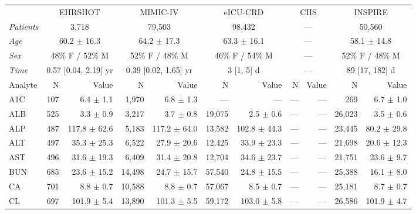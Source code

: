 \begin{table}[ht]
\centering
\scriptsize
\begin{tabular}{lrrrrrrrrrr}
\toprule
  & \multicolumn{2}{c}{EHRSHOT} & \multicolumn{2}{c}{MIMIC-IV} & \multicolumn{2}{c}{eICU-CRD} & \multicolumn{2}{c}{CHS} & \multicolumn{2}{c}{INSPIRE} \\
\cmidrule(lr){2-3} \cmidrule(lr){4-5} \cmidrule(lr){6-7} \cmidrule(lr){8-9} \cmidrule(lr){10-11}
\textit{Patients} & \multicolumn{2}{c}{3,718} & \multicolumn{2}{c}{79,503} & \multicolumn{2}{c}{98,432} & \multicolumn{2}{c}{---} & \multicolumn{2}{c}{50,560} \\
\textit{Age} & \multicolumn{2}{c}{60.2 $\pm$ 16.3} & \multicolumn{2}{c}{64.2 $\pm$ 17.3} & \multicolumn{2}{c}{63.3 $\pm$ 16.1} & \multicolumn{2}{c}{---} & \multicolumn{2}{c}{58.1 $\pm$ 14.8} \\
\textit{Sex} & \multicolumn{2}{c}{48\% F / 52\% M} & \multicolumn{2}{c}{52\% F / 48\% M} & \multicolumn{2}{c}{46\% F / 54\% M} & \multicolumn{2}{c}{---} & \multicolumn{2}{c}{52\% F / 48\% M} \\
\textit{Time} & \multicolumn{2}{c}{0.57 [0.04, 2.19] yr} & \multicolumn{2}{c}{0.39 [0.02, 1.65] yr} & \multicolumn{2}{c}{3 [1, 5] d} & \multicolumn{2}{c}{---} & \multicolumn{2}{c}{89 [17, 182] d} \\
\midrule
Analyte & N & Value & N & Value & N & Value & N & Value & N & Value \\
\midrule
A1C & 107 & 6.4 $\pm$ 1.1 & 1,970 & 6.8 $\pm$ 1.3 & --- & --- & --- & --- & 269 & 6.7 $\pm$ 1.0 \\
ALB & 525 & 3.3 $\pm$ 0.9 & 3,217 & 3.7 $\pm$ 0.8 & 19,075 & 2.5 $\pm$ 0.6 & --- & --- & 26,023 & 3.5 $\pm$ 0.6 \\
ALP & 487 & 117.8 $\pm$ 62.6 & 5,183 & 117.2 $\pm$ 64.0 & 13,582 & 102.8 $\pm$ 44.3 & --- & --- & 23,445 & 80.2 $\pm$ 29.8 \\
ALT & 497 & 35.3 $\pm$ 25.3 & 6,522 & 27.9 $\pm$ 20.6 & 12,425 & 33.9 $\pm$ 23.3 & --- & --- & 21,698 & 20.6 $\pm$ 12.3 \\
AST & 496 & 31.6 $\pm$ 19.3 & 6,409 & 31.4 $\pm$ 20.8 & 12,704 & 34.6 $\pm$ 23.7 & --- & --- & 21,751 & 23.6 $\pm$ 9.7 \\
BUN & 685 & 23.6 $\pm$ 15.2 & 14,498 & 24.7 $\pm$ 15.7 & 57,540 & 24.8 $\pm$ 15.5 & --- & --- & 25,388 & 16.1 $\pm$ 8.0 \\
CA & 701 & 8.8 $\pm$ 0.7 & 10,588 & 8.8 $\pm$ 0.7 & 57,067 & 8.5 $\pm$ 0.7 & --- & --- & 25,181 & 8.7 $\pm$ 0.7 \\
CL & 697 & 101.9 $\pm$ 5.4 & 13,890 & 101.3 $\pm$ 5.5 & 59,172 & 103.0 $\pm$ 5.8 & --- & --- & 26,586 & 101.9 $\pm$ 4.7 \\

\end{tabular}
\end{table}
